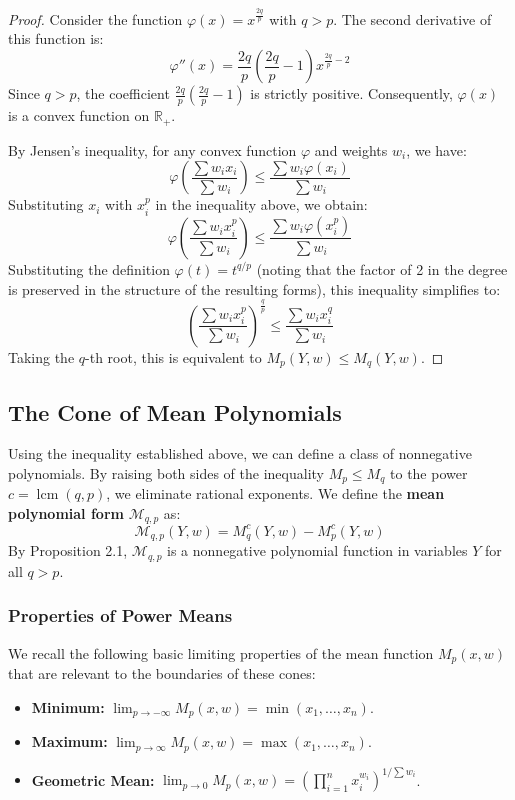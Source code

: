 \documentclass{article}
\begin{document}
\begin{proof}
Consider the function $\varphi(x) = x^{\frac{2q}{p}}$ with $q > p$. The second derivative of this function is:
\[
\varphi''(x) = \frac{2q}{p} \left( \frac{2q}{p} - 1 \right) x^{\frac{2q}{p} - 2}
\]
Since $q > p$, the coefficient $\frac{2q}{p}(\frac{2q}{p}-1)$ is strictly positive. Consequently, 
$\varphi(x)$ is a convex function on $\mathbb{R}_+$.

By Jensen's inequality, for any convex function $\varphi$ and weights $w_i$, we have:
\[
\varphi\left( \frac{\sum w_i x_i}{\sum w_i} \right) \le \frac{\sum w_i \varphi(x_i)}{\sum w_i}
\]
Substituting $x_i$ with $x_i^p$ in the inequality above, we obtain:
\[
\varphi\left( \frac{\sum w_i x_i^p}{\sum w_i} \right) \le \frac{\sum w_i \varphi(x_i^p)}{\sum w_i}
\]
Substituting the definition $\varphi(t) = t^{q/p}$ (noting that the factor of 2 in the degree is preserved in the 
structure of the resulting forms), this inequality simplifies to:
\[
\left( \frac{\sum w_i x_i^p}{\sum w_i} \right)^{\frac{q}{p}} \le \frac{\sum w_i x_i^q}{\sum w_i}
\]
Taking the $q$-th root, this is equivalent to $M_p(Y, w) \le M_q(Y, w)$.
\end{proof}

\subsection{The Cone of Mean Polynomials}

Using the inequality established above, we can define a class of nonnegative polynomials. By raising both sides of 
the inequality $M_p \le M_q$ to the power $c = \operatorname{lcm}(q, p)$, we eliminate rational exponents. 
We define the \textbf{mean polynomial form} $\mathcal{M}_{q,p}$ as:
\[
\mathcal{M}_{q,p}(Y, w) = M_q^c(Y, w) - M_p^c(Y, w)
\]
By Proposition 2.1, $\mathcal{M}_{q,p}$ is a nonnegative polynomial function in variables $Y$ for all $q > p$.

\subsubsection*{Properties of Power Means}
We recall the following basic limiting properties of the mean function $M_p(x, w)$ that are relevant to the boundaries 
of these cones:

\begin{itemize}
    \item \textbf{Minimum:} $\lim_{p \to -\infty} M_p(x, w) = \min(x_1, \dots, x_n)$.
    \item \textbf{Maximum:} $\lim_{p \to \infty} M_p(x, w) = \max(x_1, \dots, x_n)$.
    \item \textbf{Geometric Mean:} $\lim_{p \to 0} M_p(x, w) = \left( \prod_{i=1}^n x_i^{w_i} \right)^{1 / \sum w_i}$.
\end{itemize}
\end{document}
